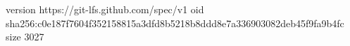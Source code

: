 version https://git-lfs.github.com/spec/v1
oid sha256:c0e187f7604f352158815a3dfd8b5218b8ddd8e7a336903082deb45f9fa9b4fc
size 3027
